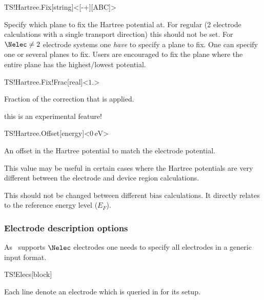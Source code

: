 \begin{fdfentry}{TS!Hartree.Fix}[string]<[-+][ABC]>

  Specify which plane to fix the Hartree potential at. For regular (2
  electrode calculations with a single transport direction) this
  should not be set.
  For $\Nelec\neq2$ electrode systems one \emph{have} to specify a
  plane to fix. One can specify one or several planes to fix. Users
  are encouraged to fix the plane where the entire plane has the
  highest/lowest potential.

\end{fdfentry}

\begin{fdfentry}{TS!Hartree.Fix!Frac}[real]<$1.$>

  Fraction of the correction that is applied.

  \note this is an experimental feature!

\end{fdfentry}

\begin{fdfentry}{TS!Hartree.Offset}[energy]<$0\,\mathrm{eV}$>

  An offset in the Hartree potential to match the electrode potential.

  This value may be useful in certain cases where the Hartree
  potentials are very different between the electrode and device
  region calculations.

  This should not be changed between different bias calculations. It
  directly relates to the reference energy level ($E_F$).

\end{fdfentry}

\subsubsection{Electrode description options}

As \tsiesta\ supports $\Nelec$ electrodes one needs to specify all
electrodes in a generic input format.

\begin{fdfentry}{TS!Elecs}[block]

  Each line denote an electrode which is queried in 
  for its setup.
  
\end{fdfentry}

